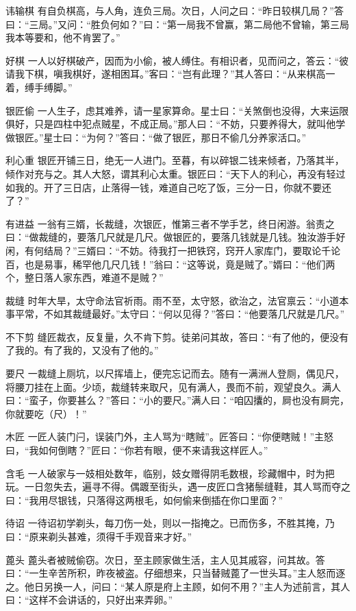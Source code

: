 \documentclass[12pt,UTF8]{ctexbook}
\begin{document}
讳输棋
有自负棋高，与人角，连负三局。次日，人问之曰：“昨日较棋几局？”答曰：“三局。”又问：“胜负何如？”曰：“第一局我不曾赢，第二局他不曾输，第三局我本等要和，他不肯罢了。”

好棋
一人以好棋破产，因而为小偷，被人缚住。有相识者，见而问之，答云：“彼请我下棋，嗔我棋好，遂相困耳。”客曰：“岂有此理？”其人答曰：“从来棋高一着，缚手缚脚。”

银匠偷
一人生子，虑其难养，请一星家算命。星士曰：“关煞倒也没得，大来运限俱好，只是四柱中犯点贼星，不成正局。”那人曰：“不妨，只要养得大，就叫他学做银匠。”星士曰：“为何？”答曰：“做了银匠，那日不偷几分养家活口。”

利心重
银匠开铺三日，绝无一人进门。至暮，有以碎银二钱来倾者，乃落其半，倾作对充与之。其人大怒，谓其利心太重。银匠曰：“天下人的利心，再没有轻过如我的。开了三日店，止落得一钱，难道自己吃了饭，三分一日，你就不要还了？”

有进益
一翁有三婿，长裁缝，次银匠，惟第三者不学手艺，终日闲游。翁责之曰：“做裁缝的，要落几尺就是几尺。做银匠的，要落几钱就是几钱。独汝游手好闲，有何结局？”三婿曰：“不妨。待我打一把铁窍，窍开人家库门，要取论千论百，也是易事，稀罕他几尺几钱！”翁曰：“这等说，竟是贼了。”婿曰：“他们两个，整日落人家东西，难道不是贼？”

裁缝
时年大旱，太守命法官祈雨。雨不至，太守怒，欲治之，法官禀云：“小道本事平常，不如其裁缝最好。”太守曰：“何以见得？”答曰：“他要落几尺就是几尺。”

不下剪
缝匠裁衣，反复量，久不肯下剪。徒弟问其故，答曰：“有了他的，便没有了我的。有了我的，又没有了他的。”

要尺
一裁缝上厕坑，以尺挥墙上，便完忘记而去。随有一满洲人登厕，偶见尺，将腰刀挂在上面。少顷，裁缝转来取尺，见有满人，畏而不前，观望良久。满人曰：“蛮子，你要甚么？”答曰：“小的要尺。”满人曰：“咱囚攮的，屙也没有屙完，你就要吃（尺）！”

木匠
一匠人装门闩，误装门外，主人骂为“瞎贼”。匠答曰：“你便瞎贼！”主怒曰，“我如何倒瞎？”匠曰：“你若有眼，便不来请我这样匠人。”

含毛
一人破家与一妓相处数年，临别，妓女赠得阴毛数根，珍藏帽中，时为把玩。一日忽失去，遍寻不得。偶踱至街头，遇一皮匠口含猪鬃缝鞋，其人骂而夺之曰：“我用尽银钱，只落得这两根毛，如何偷来倒插在你口里面？”

待诏
一待诏初学剃头，每刀伤一处，则以一指掩之。已而伤多，不胜其掩，乃曰：“原来剃头甚难，须得千手观音来才好。”

蓖头
蓖头者被贼偷窃。次日，至主顾家做生活，主人见其戚容，问其故。答曰：“一生辛苦所积，昨夜被盗。仔细想来，只当替贼蓖了一世头耳。”主人怒而逐之。他日另换一人，问曰：“某人原是府上主顾，如何不用？”主人为述前言，其人曰：“这样不会讲话的，只好出来弄卵。”
\end{document}
